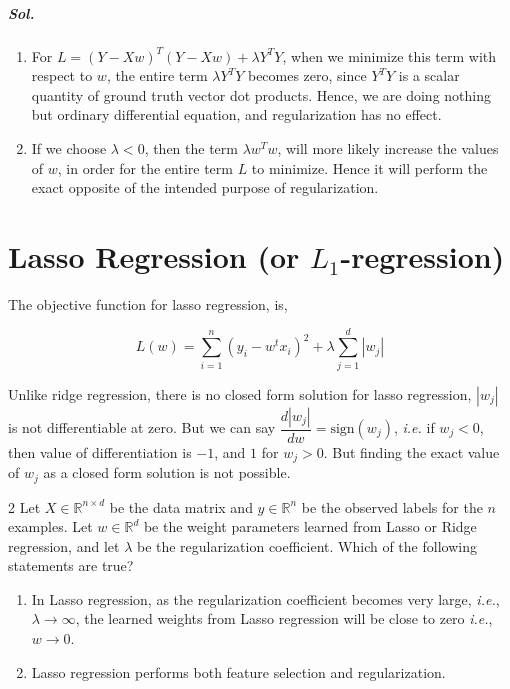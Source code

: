 \documentclass{scrartcl}
\newcounter{prob}
\begin{document}
	\subparagraph{Sol.}
	\begin{enumerate}[label*=(\alph*)]
		\item For \(L=(Y-Xw)^T(Y-Xw)+\lambda Y^TY\), when we minimize this term with respect to \(w\), the entire term \(\lambda Y^TY\) becomes zero, since \(Y^TY\) is a scalar quantity of ground truth vector dot products. Hence, we are doing nothing but ordinary differential equation, and regularization has no effect.
		
		\item If we choose \(\lambda<0\), then the term \(\lambda w^Tw\), will more likely increase the values of \(w\), in order for the entire term \(L\) to minimize. Hence it will perform the exact opposite of the intended purpose of regularization.
	\end{enumerate}
	
	\section{Lasso Regression (or \(L_1\)-regression)}
	
	The objective function for lasso regression, is,
	
	\begin{equation}
		L(w)=\sum_{i=1}^{n}(y_i-w^tx_i)^2+\lambda\sum_{j=1}^{d}|w_j|
	\end{equation}
	
	Unlike ridge regression, there is no closed form solution for lasso regression, \(|w_j|\) is not differentiable at zero. But we can say \(\dfrac{d|w_j|}{dw}=\text{sign}(w_j)\), \textit{i.e.} if \(w_j<0\), then value of differentiation is \(-1\), and \(1\) for \(w_j>0\). But finding the exact value of \(w_j\) as a closed form solution is not possible.
	
	\begin{prob}{2}
		Let \(X\in\mathbb{R}^{n\times d}\) be the data matrix and \(y\in\mathbb{R}^n\) be the observed labels for the \(n\) examples. Let \(w\in\mathbb{R}^d\) be the weight parameters learned from Lasso or Ridge regression, and let \(\lambda\) be the regularization coefficient. Which of the following statements are true?
		
		\begin{enumerate}[label*=\Roman*.]
			\item In Lasso regression, as the regularization coefficient becomes very large, \textit{i.e.}, \(\lambda\rightarrow\infty\), the learned weights from Lasso regression will be close to zero \textit{i.e.}, \(w\rightarrow0\).
			\item Lasso regression performs both feature selection and regularization.
		\end{enumerate}
	\end{prob}
	
\end{document}
